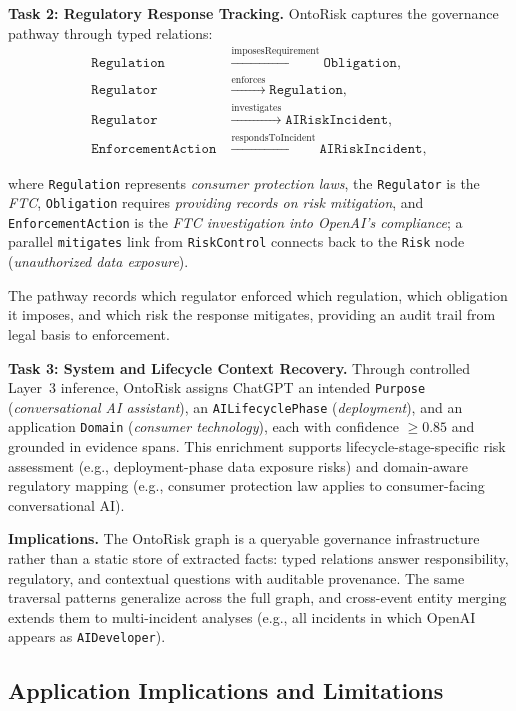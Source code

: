 \documentclass[a4paper,fleqn]{cas-dc}
\begin{document}
\textbf{Task 2: Regulatory Response Tracking.}
OntoRisk captures the governance pathway through typed relations:
\begin{align*}
\texttt{Regulation} & \xrightarrow{\text{imposesRequirement}}
\texttt{Obligation}, \\
\texttt{Regulator} & \xrightarrow{\text{enforces}} \texttt{Regulation}, \\
\texttt{Regulator} & \xrightarrow{\text{investigates}}
\texttt{AIRiskIncident}, \\
\texttt{EnforcementAction} & \xrightarrow{\text{respondsToIncident}}
\texttt{AIRiskIncident},
\end{align*}
{\sloppy
where \texttt{Regulation} represents \textit{consumer protection
laws}, the \texttt{Regulator} is the \textit{FTC},
\texttt{Obligation} requires \textit{providing records on risk
mitigation}, and \texttt{EnforcementAction} is the \textit{FTC
investigation into OpenAI's compliance}; a parallel
\texttt{mitigates} link from \texttt{RiskControl} connects back to
the \texttt{Risk} node (\textit{unauthorized data exposure}).\par}
The pathway records which regulator enforced which regulation, which
obligation it imposes, and which risk the response mitigates,
providing an audit trail from legal basis to enforcement.

\textbf{Task 3: System and Lifecycle Context Recovery.}
Through controlled Layer~3 inference, OntoRisk assigns ChatGPT an
intended \texttt{Purpose} (\textit{conversational AI assistant}), an
\texttt{AILifecyclePhase} (\textit{deployment}), and an application
\texttt{Domain} (\textit{consumer technology}), each with confidence
$\geq 0.85$ and grounded in evidence spans.
This enrichment supports lifecycle-stage-specific risk assessment
(e.g., deployment-phase data exposure risks) and domain-aware
regulatory mapping (e.g., consumer protection law applies to
consumer-facing conversational AI).

\textbf{Implications.}
The OntoRisk graph is a queryable governance infrastructure rather
than a static store of extracted facts: typed relations answer
responsibility, regulatory, and contextual questions with auditable
provenance.
The same traversal patterns generalize across the full graph, and
cross-event entity merging extends them to multi-incident analyses
(e.g., all incidents in which OpenAI appears as
\texttt{AIDeveloper}).

\subsection{Application Implications and Limitations}
\label{sec:limitations}
\end{document}

